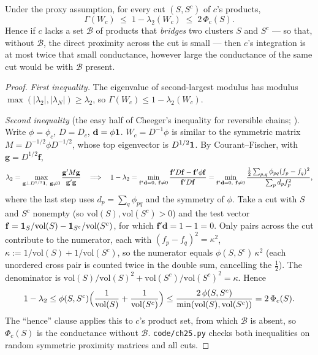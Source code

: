 \documentclass[../structural_economics_book.tex]{subfiles}
\begin{document}
\begin{proposition}\label{ch25:prop:bridge_bound}
Under the proxy assumption, for every cut $(S, S^c)$ of $c$'s products,
\begin{equation}\label{ch25:eq:truncation_bound}
\Gamma(W_c) \;\le\; 1 - \lambda_2(W_c) \;\le\; 2\,\Phi_c(S).
\end{equation}
Hence if $c$ lacks a set $\mathcal{B}$ of products that \emph{bridges} two clusters $S$ and $S^c$ --- so that, without $\mathcal{B}$, the direct proximity across the cut is small --- then $c$'s integration is at most twice that small conductance, however large the conductance of the same cut would be with $\mathcal{B}$ present.
\end{proposition}
\begin{proof}
\emph{First inequality.} The eigenvalue of second-largest modulus has modulus $\max(|\lambda_2|, |\lambda_N|) \ge \lambda_2$, so $\Gamma(W_c) \le 1 - \lambda_2(W_c)$.

\emph{Second inequality} (the easy half of Cheeger's inequality for reversible chains; \citealp{lawler1988bounds,sinclair1989approximate}). Write $\phi = \phi_c$, $D = D_c$, $\mathbf{d} = \phi\mathbf{1}$. $W_c = D^{-1}\phi$ is similar to the symmetric matrix $M = D^{-1/2}\phi D^{-1/2}$, whose top eigenvector is $D^{1/2}\mathbf{1}$. By Courant--Fischer, with $\mathbf{g} = D^{1/2}\mathbf{f}$,
\[
\lambda_2 = \max_{\mathbf{g} \perp D^{1/2}\mathbf{1},\ \mathbf{g} \ne 0}\frac{\mathbf{g}'M\mathbf{g}}{\mathbf{g}'\mathbf{g}}
\quad\Longrightarrow\quad
1 - \lambda_2 = \min_{\mathbf{f}'\mathbf{d} = 0,\ \mathbf{f} \ne 0}\frac{\mathbf{f}'D\mathbf{f} - \mathbf{f}'\phi\mathbf{f}}{\mathbf{f}'D\mathbf{f}}
= \min_{\mathbf{f}'\mathbf{d} = 0,\ \mathbf{f} \ne 0}\frac{\tfrac12\sum_{p,q}\phi_{pq}(f_p - f_q)^2}{\sum_p d_pf_p^2},
\]
where the last step uses $d_p = \sum_q \phi_{pq}$ and the symmetry of $\phi$. Take a cut with $S$ and $S^c$ nonempty (so $\mathrm{vol}(S), \mathrm{vol}(S^c) > 0$) and the test vector $\mathbf{f} = \mathbf{1}_S/\mathrm{vol}(S) - \mathbf{1}_{S^c}/\mathrm{vol}(S^c)$, for which $\mathbf{f}'\mathbf{d} = 1 - 1 = 0$. Only pairs across the cut contribute to the numerator, each with $(f_p - f_q)^2 = \kappa^2$, $\kappa := 1/\mathrm{vol}(S) + 1/\mathrm{vol}(S^c)$, so the numerator equals $\phi(S,S^c)\,\kappa^2$ (each unordered cross pair is counted twice in the double sum, cancelling the $\tfrac12$). The denominator is $\mathrm{vol}(S)/\mathrm{vol}(S)^2 + \mathrm{vol}(S^c)/\mathrm{vol}(S^c)^2 = \kappa$. Hence
\[
1 - \lambda_2 \le \phi(S,S^c)\Bigl(\frac{1}{\mathrm{vol}(S)} + \frac{1}{\mathrm{vol}(S^c)}\Bigr) \le \frac{2\,\phi(S,S^c)}{\min(\mathrm{vol}(S),\mathrm{vol}(S^c))} = 2\,\Phi_c(S).
\]
The ``hence'' clause applies this to $c$'s product set, from which $\mathcal{B}$ is absent, so $\Phi_c(S)$ is the conductance without $\mathcal{B}$. \texttt{code/ch25.py} checks both inequalities on random symmetric proximity matrices and all cuts.
\end{proof}
\end{document}
